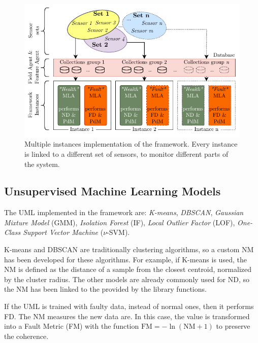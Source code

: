 \begin{figure}
    \includegraphics[width=\linewidth]{images/FrameworkInstances.pdf}
    \caption{Multiple instances implementation of the framework. Every instance is linked to a different set of sensors, to monitor different parts of the system.}
    \label{fig:multiple_instances}
\end{figure}


\subsection{Unsupervised Machine Learning Models}

The UML implemented in the framework are: \emph{K-means}, \emph{DBSCAN}, \emph{Gaussian Mixture Model} (GMM), \emph{Isolation Forest} (IF), \emph{Local Outlier Factor} (LOF), \emph{One-Class Support Vector Machine} ($\nu$-SVM).

K-means and DBSCAN are traditionally clustering algorithms, so a custom NM has been developed for these algorithms. For example, if K-means is used, the NM is defined as the distance of a sample from the closest centroid, normalized by the cluster radius. The other models are already commonly used for ND, so the NM has been linked to the  provided by the library functions.

If the UML is trained with faulty data, instead of normal ones, then it performs FD. The NM measures  the new data are. In this case, the value is transformed into a Fault Metric (FM) with the function $\text{FM} = - \ln(\text{NM} + 1)$ to preserve the coherence. 